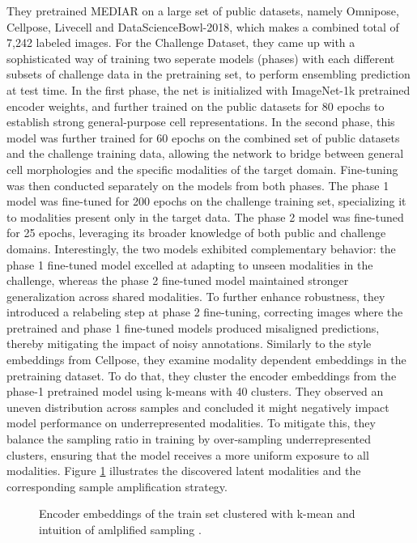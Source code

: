 They pretrained MEDIAR on a large set of public datasets, namely Omnipose, Cellpose, Livecell and DataScienceBowl-2018, which makes a combined total of 7,242 labeled images. For the Challenge Dataset, they came up with a sophisticated way of training two seperate models (phases) with each different subsets of challenge data in the pretraining set, to perform ensembling prediction at test time. In the first phase, the net is initialized with ImageNet-1k pretrained encoder weights, and further trained on the public datasets for 80 epochs to establish strong general-purpose cell representations. In the second phase, this model was further trained for 60 epochs on the combined set of public datasets and the challenge training data, allowing the network to bridge between general cell morphologies and the specific modalities of the target domain. Fine-tuning was then conducted separately on the models from both phases. The phase 1 model was fine-tuned for 200 epochs on the challenge training set, specializing it to modalities present only in the target data. The phase 2 model was fine-tuned for 25 epochs, leveraging its broader knowledge of both public and challenge domains. Interestingly, the two models exhibited complementary behavior: the phase 1 fine-tuned model excelled at adapting to unseen modalities in the challenge, whereas the phase 2 fine-tuned model maintained stronger generalization across shared modalities. To further enhance robustness, they introduced a relabeling step at phase 2 fine-tuning, correcting images where the pretrained and phase 1 fine-tuned models produced misaligned predictions, thereby mitigating the impact of noisy annotations.
Similarly to the style embeddings from Cellpose, they examine modality dependent embeddings in the pretraining dataset. To do that, they cluster the encoder embeddings from the phase-1 pretrained model using k-means with 40 clusters. They observed an uneven distribution across samples and concluded it might negatively impact model performance on underrepresented modalities. To mitigate this, they balance the sampling ratio in training by over-sampling underrepresented clusters, ensuring that the model receives a more uniform exposure to all modalities. Figure \ref{fig:latent_modalities} illustrates the discovered latent modalities and the corresponding sample amplification strategy.

\begin{figure}[!ht]
    \centering
    \caption{Encoder embeddings of the train set clustered with k-mean and intuition of amlplified sampling \cite{LeCun.1989}.}
    \label{fig:latent_modalities}
\end{figure}

